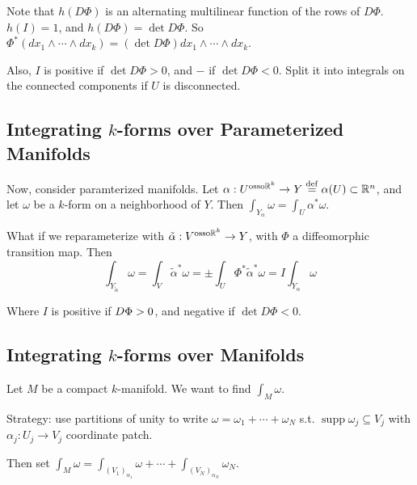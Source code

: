 \documentclass[10pt,letterpaper]{article}
\newcommand{\n}{\hfill\break}
\newcommand{\ptxt}[1]{\textrm{\textnormal{#1}}}
\newcommand{\reals}{\mathbb{R}}
\newcommand{\R}{\reals}
\let\deg\relax
\DeclareMathOperator{\deg}{deg}
\DeclareMathOperator{\supp}{supp}
\newcommand{\st}{s.t.}
\newcommand{\eqdef}{\overset{\ptxt{def}}{=}}
\begin{document}
\par\noindent Note that $h(D\Phi)$ is an alternating multilinear function of the rows of $D\Phi$. $h(I)=1$, and $h(D\Phi)=\det{}D\Phi$. So $\Phi^{*}(dx_{1}\wedge\cdots\wedge{}dx_{k})=(\det{}D\Phi)dx_{1}\wedge\cdots\wedge{}dx_{k}$.\n

\par\noindent Also, $I$ is positive if $\det{}D\Phi>0$, and $-$ if $\det{}D\Phi<0$. Split it into integrals on the connected components if $U$ is disconnected.\n

\newpage

\subsection{Integrating $k$-forms over Parameterized Manifolds}

\par\noindent Now, consider paramterized manifolds. Let $\alpha:U^{\ptxt{osso}\R^{k}}\to{}Y\eqdef\alpha(U)\subset\R^{n}$, and let $\omega$ be a $k$-form on a neighborhood of $Y$. Then $\int_{Y_{\alpha}}\omega=\int_{U}\alpha^{*}\omega$.\n

\par\noindent What if we reparameterize with $\tilde{\alpha}:V^{\ptxt{osso}\R^{k}}\to{}Y$, with $\Phi$ a diffeomorphic transition map. Then
\[
\int_{Y_{\tilde{\alpha}}}\omega=\int_{V}\tilde{\alpha}^{*}\omega=\pm\int_{U}\Phi^{*}\tilde{\alpha}^{*}\omega=I\int_{Y_{\alpha}}\omega
\]

\par\noindent Where $I$ is positive if $\deg{}D\Phi>0$, and negative if $\det{}D\Phi<0$.\n

\subsection{Integrating $k$-forms over Manifolds}

\par\noindent Let $M$ be a compact $k$-manifold. We want to find $\int_{M}\omega$.\n

\par\noindent Strategy: use partitions of unity to write $\omega=\omega_{1}+\cdots+\omega_{N}$ \st{} $\supp{}\omega_{j}\subseteq{}V_{j}$ with $\alpha_{j}:U_{j}\to{}V_{j}$ coordinate patch.\n

\par\noindent Then set $\displaystyle\int_{M}\omega=\int_{(V_{1})_{\alpha_{1}}}\omega+\cdots+\int_{(V_{N})_{\alpha_{N}}}\omega_{N}$.
\end{document}
